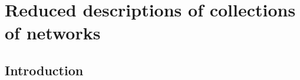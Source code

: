 
\chapter{Reduced descriptions of collections of
  networks \label{ch:graphs}}



\section{Introduction\label{sec:intro}}
  

